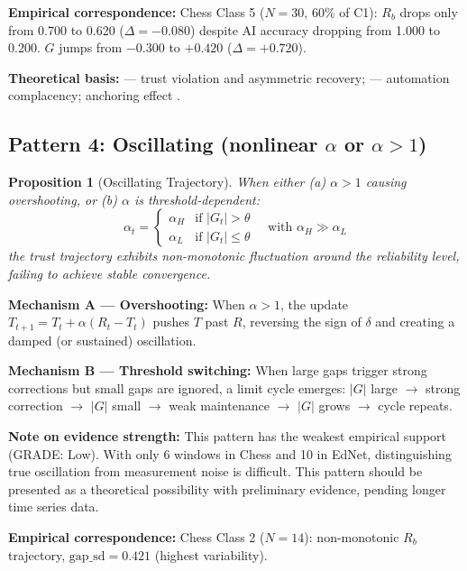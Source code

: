 \documentclass[12pt]{article}
\newtheorem{proposition}{Proposition}
\begin{document}
\textbf{Empirical correspondence:}
Chess Class 5 ($N=30$, 60\% of C1):
$R_b$ drops only from 0.700 to 0.620 ($\Delta = -0.080$)
despite AI accuracy dropping from 1.000 to 0.200.
$G$ jumps from $-0.300$ to $+0.420$ ($\Delta = +0.720$).

\textbf{Theoretical basis:}
\citet{lee1992trust} --- trust violation and asymmetric recovery;
\citet{parasuraman1993performance} --- automation complacency;
anchoring effect \citep{tversky1974judgment}.


\subsection{Pattern 4: Oscillating (nonlinear $\alpha$ or $\alpha > 1$)}

\begin{proposition}[Oscillating Trajectory]
  When either (a) $\alpha > 1$ causing overshooting, or
  (b) $\alpha$ is threshold-dependent:
  \begin{equation}
    \alpha_t =
    \begin{cases}
      \alpha_H & \text{if } |G_t| > \theta \\
      \alpha_L & \text{if } |G_t| \leq \theta
    \end{cases}
    \quad \text{with } \alpha_H \gg \alpha_L
  \end{equation}
  the trust trajectory exhibits non-monotonic fluctuation
  around the reliability level, failing to achieve stable
  convergence.
\end{proposition}

\textbf{Mechanism A --- Overshooting:}
When $\alpha > 1$, the update $T_{t+1} = T_t + \alpha(R_t - T_t)$
pushes $T$ past $R$, reversing the sign of $\delta$ and creating
a damped (or sustained) oscillation.

\textbf{Mechanism B --- Threshold switching:}
When large gaps trigger strong corrections but small gaps
are ignored, a limit cycle emerges:
$|G|$ large $\to$ strong correction $\to$ $|G|$ small $\to$
weak maintenance $\to$ $|G|$ grows $\to$ cycle repeats.

\textbf{Note on evidence strength:}
This pattern has the weakest empirical support (GRADE: Low).
With only 6 windows in Chess and 10 in EdNet, distinguishing
true oscillation from measurement noise is difficult.
This pattern should be presented as a theoretical possibility
with preliminary evidence, pending longer time series data.

\textbf{Empirical correspondence:}
Chess Class 2 ($N=14$): non-monotonic $R_b$ trajectory,
$\text{gap\_sd} = 0.421$ (highest variability).
\end{document}
